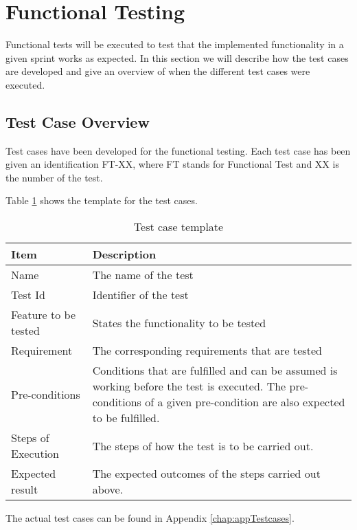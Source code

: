 \section{Functional Testing}

Functional tests will be executed to test that the implemented functionality in a given sprint works as expected.
In this section we will describe how the test cases are developed and give an overview of when the different test
cases were executed.

\subsection*{Test Case Overview}

Test cases have been developed for the functional testing. Each test case has been given an identification FT-XX, where FT stands for Functional Test and XX is the number of the test.

Table \ref{table:testcasetemplate} shows the template for the test cases.


\begin{table}[H]
\centering
	\begin{tabular}{ l | p{8cm} }
		\hline
		\rowcolor{lightgray}
		{\bf Item} & {\bf Description} \\ \hline
		Name & The name of the test \\ 
		Test Id & Identifier of the test \\ 
		Feature to be tested & States the functionality to be tested \\ 
		Requirement & The corresponding requirements that are tested \\ 
		Pre-conditions & Conditions that are fulfilled and can be assumed is working before the test is executed. The pre-conditions of a given pre-condition are also expected to be fulfilled. \\ 
		Steps of Execution & The steps of how the test is to be carried out. \\ 
		Expected result & The expected outcomes of the steps carried out above. \\ 
	\end{tabular}
	\caption{Test case template}
	\label{table:testcasetemplate}
\end{table}

The actual test cases can be found in Appendix \ref{chap:appTestcases}.